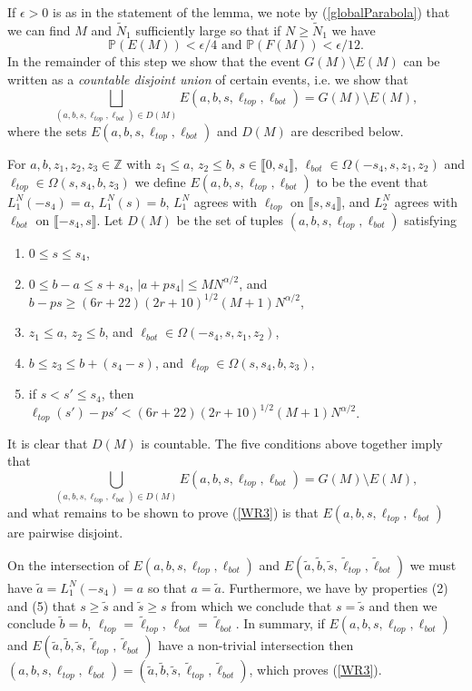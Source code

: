 If $\epsilon > 0$ is as in the statement of the lemma, we note by (\ref{globalParabola}) that we can find $M$ and $\tilde{N}_1$ sufficiently large so that if $N \geq \tilde{N}_1$ we have 
\begin{equation}\label{4.2EFbounds}
	\mathbb{P}(E(M)) < \epsilon/4 \mbox{ and } \mathbb{P}(F(M)) < \epsilon/12.
\end{equation}
In the remainder of this step we show that the event $G(M) \setminus E(M)$ can be written as a {\em countable disjoint union} of certain events, i.e. we show that
\begin{equation}\label{WR3}
	\bigsqcup\limits_{(a,b,s,\ell_{top},\ell_{bot}) \in D(M)}  E(a,b,s,\ell_{top},\ell_{bot}) = G(M) \setminus E(M),
\end{equation}
where the sets $E(a,b,s,\ell_{top},\ell_{bot})$ and $D(M)$ are described below. 

For $a,b,z_1,z_2,z_3 \in\mathbb{Z}$ with $z_1\leq a$, $z_2\leq b$, $s\in\llbracket 0, s_4 \rrbracket$, $\ell_{bot}\in\Omega(-s_4,s,z_1,z_2)$ and $\ell_{top}\in\Omega(s,s_4,b,z_3)$ we define $E(a,b,s,\ell_{top},\ell_{bot})$ to be the event that $L_1^N(-s_4) = a$, $L_1^N(s) = b$, $L_1^N$ agrees with $\ell_{top}$ on $\llbracket s,s_4\rrbracket$, and $L_2^N$ agrees with $\ell_{bot}$ on $\llbracket -s_4,s \rrbracket$.  Let $D(M)$ be the set of tuples $(a,b,s, \ell_{top}, \ell_{bot})$ satisfying
\begin{enumerate}[label=(\arabic*)]
	\item $0\leq s\leq s_4$,
	\item $0\leq b-a \leq s + s_4$, $|a + ps_4| \leq MN^{\alpha/2}$, and $b-ps \geq (6r+22)(2r+10)^{1/2}(M+1)N^{\alpha/2}$,
	\item $z_1\leq a$, $z_2\leq b$, and $\ell_{bot}\in\Omega(-s_4, s, z_1, z_2)$,
	\item $b \leq z_3 \leq b + (s_4 - s)$, and $\ell_{top} \in\Omega(s, s_4, b, z_3)$,
	\item if $s < s' \leq s_4$, then $\ell_{top}(s') -ps' < (6r+22)(2r+10)^{1/2}(M+1)N^{\alpha/2}$.
\end{enumerate}
It is clear that $D(M)$ is countable. The five conditions above together imply that 
$$\bigcup_{(a,b,s,\ell_{top},\ell_{bot}) \in D(M)}  E(a,b,s,\ell_{top},\ell_{bot}) = G(M) \setminus E(M),$$
and what remains to be shown to prove (\ref{WR3}) is that $E(a,b,s,\ell_{top},\ell_{bot})$ are pairwise disjoint. 

On the intersection of $E(a,b,s,\ell_{top},\ell_{bot})$ and $E(\tilde{a},\tilde{b},\tilde{s},\tilde{\ell}_{top},\tilde{\ell}_{bot})$ we must have $\tilde{a} = L_1^N(-s_4) = a$ so that $a = \tilde{a}$. Furthermore, we have by properties (2) and (5) that $s \geq \tilde{s}$ and $\tilde{s} \geq s$ from which we conclude that $s= \tilde{s}$ and then we conclude $\tilde{b} = b$, $\ell_{top} = \tilde{\ell}_{top}$, $\ell_{bot} = \tilde{\ell}_{bot}$. In summary, if $E(a,b,s,\ell_{top},\ell_{bot})$ and $E(\tilde{a},\tilde{b},\tilde{s},\tilde{\ell}_{top},\tilde{\ell}_{bot})$ have a non-trivial intersection then $(a,b,s,\ell_{top},\ell_{bot}) = (\tilde{a},\tilde{b},\tilde{s},\tilde{\ell}_{top},\tilde{\ell}_{bot})$, which proves (\ref{WR3}).\\

